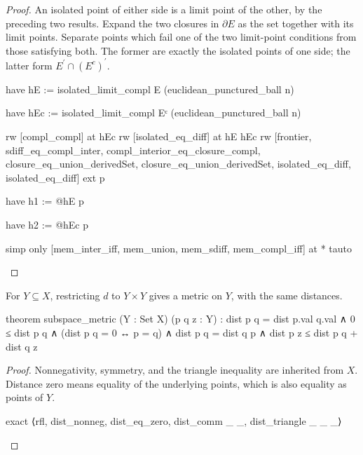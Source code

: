 \begin{proof}
  An isolated point of either side is a limit point of the other, by the preceding two results.
  Expand the two closures in $\partial E$ as the set together with its limit points.
  Separate points which fail one of the two limit-point conditions from those satisfying both.
  The former are exactly the isolated points of one side; the latter form
  $E^{\prime}\cap(E^{c})^{\prime}$.

  \begin{lean}
    have hE := isolated_limit_compl E (euclidean_punctured_ball n)

    have hEc := isolated_limit_compl Eᶜ (euclidean_punctured_ball n)

    rw [compl_compl] at hEc
    rw [isolated_eq_diff] at hE hEc
    rw [frontier, sdiff_eq_compl_inter,
      compl_interior_eq_closure_compl, closure_eq_union_derivedSet,
      closure_eq_union_derivedSet, isolated_eq_diff, isolated_eq_diff]
    ext p

    have h1 := @hE p

    have h2 := @hEc p

    simp only [mem_inter_iff, mem_union, mem_sdiff, mem_compl_iff] at *
    tauto
  \end{lean}

\end{proof}

\begin{proposition}
  \label{an1:lem:subspace-metric}
  For $Y\subseteq X$, restricting $d$ to $Y\times Y$ gives a metric on $Y$, with the same
  distances.

  \begin{lean}
    theorem subspace_metric (Y : Set X) (p q z : Y) :
        dist p q = dist p.val q.val ∧ 0 ≤ dist p q ∧
        (dist p q = 0 ↔ p = q) ∧ dist p q = dist q p ∧
        dist p z ≤ dist p q + dist q z
  \end{lean}
\end{proposition}

\begin{proof}
  Nonnegativity, symmetry, and the triangle inequality are inherited from $X$.
  Distance zero means equality of the underlying points, which is also equality as points of $Y$.

  \begin{lean}
    exact ⟨rfl, dist_nonneg, dist_eq_zero, dist_comm _ _, dist_triangle _ _ _⟩
  \end{lean}

\end{proof}


